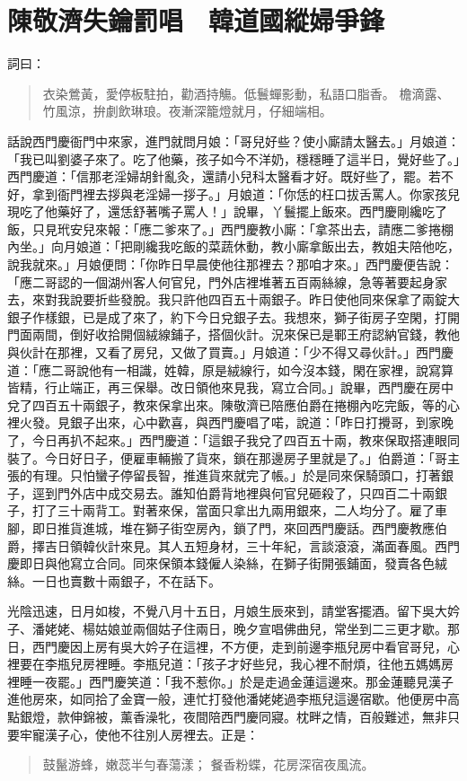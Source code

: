 
\chapter{陳敬濟失鑰罰唱　韓道國縱婦爭鋒}

詞曰：
\begin{quote}
衣染鶯黃，愛停板駐拍，勸酒持觴。低鬟蟬影動，私語口脂香。
檐滴露、竹風涼，拚劇飲琳琅。夜漸深籠燈就月，仔細端相。
\end{quote}

話說西門慶衙門中來家，進門就問月娘：「哥兒好些？使小廝請太醫去。」月娘道：「我已叫劉婆子來了。吃了他藥，孩子如今不洋奶，穩穩睡了這半日，覺好些了。」西門慶道：「信那老淫婦胡針亂灸，還請小兒科太醫看才好。既好些了，罷。若不好，拿到衙門裡去拶與老淫婦一拶子。」月娘道：「你恁的枉口拔舌罵人。你家孩兒現吃了他藥好了，還恁舒著嘴子罵人！」說畢，丫鬟擺上飯來。西門慶剛纔吃了飯，只見玳安兒來報：「應二爹來了。」西門慶教小廝：「拿茶出去，請應二爹捲棚內坐。」向月娘道：「把剛纔我吃飯的菜蔬休動，教小廝拿飯出去，教姐夫陪他吃，說我就來。」月娘便問：「你昨日早晨使他往那裡去？那咱才來。」西門慶便告說：「應二哥認的一個湖州客人何官兒，門外店裡堆著五百兩絲線，急等著要起身家去，來對我說要折些發脫。我只許他四百五十兩銀子。昨日使他同來保拿了兩錠大銀子作樣銀，已是成了來了，約下今日兌銀子去。我想來，獅子街房子空閑，打開門面兩間，倒好收拾開個絨線鋪子，搭個伙計。況來保已是鄆王府認納官錢，教他與伙計在那裡，又看了房兒，又做了買賣。」月娘道：「少不得又尋伙計。」西門慶道：「應二哥說他有一相識，姓韓，原是絨線行，如今沒本錢，閑在家裡，說寫算皆精，行止端正，再三保舉。改日領他來見我，寫立合同。」說畢，西門慶在房中兌了四百五十兩銀子，教來保拿出來。陳敬濟已陪應伯爵在捲棚內吃完飯，等的心裡火發。見銀子出來，心中歡喜，與西門慶唱了喏，說道：「昨日打攪哥，到家晚了，今日再扒不起來。」西門慶道：「這銀子我兌了四百五十兩，教來保取搭連眼同裝了。今日好日子，便雇車輛搬了貨來，鎖在那邊房子里就是了。」伯爵道：「哥主張的有理。只怕蠻子停留長智，推進貨來就完了帳。」於是同來保騎頭口，打著銀子，逕到門外店中成交易去。誰知伯爵背地裡與何官兒砸殺了，只四百二十兩銀子，打了三十兩背工。對著來保，當面只拿出九兩用銀來，二人均分了。雇了車腳，即日推貨進城，堆在獅子街空房內，鎖了門，來回西門慶話。西門慶教應伯爵，擇吉日領韓伙計來見。其人五短身材，三十年紀，言談滾滾，滿面春風。西門慶即日與他寫立合同。同來保領本錢僱人染絲，在獅子街開張鋪面，發賣各色絨絲。一日也賣數十兩銀子，不在話下。

光陰迅速，日月如梭，不覺八月十五日，月娘生辰來到，請堂客擺酒。留下吳大妗子、潘姥姥、楊姑娘並兩個姑子住兩日，晚夕宣唱佛曲兒，常坐到二三更才歇。那日，西門慶因上房有吳大妗子在這裡，不方便，走到前邊李瓶兒房中看官哥兒，心裡要在李瓶兒房裡睡。李瓶兒道：「孩子才好些兒，我心裡不耐煩，往他五媽媽房裡睡一夜罷。」西門慶笑道：「我不惹你。」於是走過金蓮這邊來。那金蓮聽見漢子進他房來，如同拾了金寶一般，連忙打發他潘姥姥過李瓶兒這邊宿歇。他便房中高點銀燈，款伸錦被，薰香澡牝，夜間陪西門慶同寢。枕畔之情，百般難述，無非只要牢寵漢子心，使他不往別人房裡去。正是：
\begin{quote}
鼓鬣游蜂，嫩蕊半勻春蕩漾；
餐香粉蝶，花房深宿夜風流。
\end{quote}

